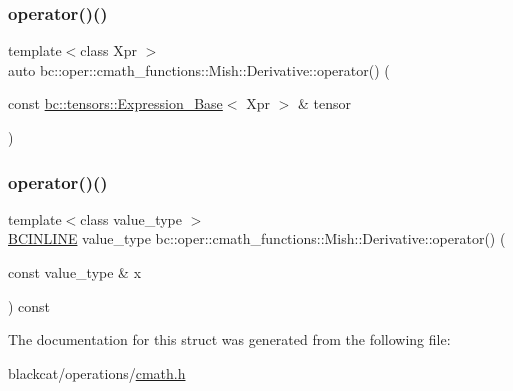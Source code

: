 \mbox{\label{structbc_1_1oper_1_1cmath__functions_1_1Mish_1_1Derivative_a211093825ea4c5a909ed07844444f437}} 
\subsubsection{\texorpdfstring{operator()()}{operator()()}\hspace{0.1cm}{\footnotesize\ttfamily [2/3]}}
{\footnotesize\ttfamily template$<$class Xpr $>$ \\
auto bc\+::oper\+::cmath\+\_\+functions\+::\+Mish\+::\+Derivative\+::operator() (\begin{DoxyParamCaption}\item[{const \hyperlink{classbc_1_1tensors_1_1Expression__Base}{bc\+::tensors\+::\+Expression\+\_\+\+Base}$<$ Xpr $>$ \&}]{tensor }\end{DoxyParamCaption})\hspace{0.3cm}{\ttfamily [inline]}}

\mbox{\label{structbc_1_1oper_1_1cmath__functions_1_1Mish_1_1Derivative_a3b861c6da9893fa730f8a04bcece5d4d}} 
\subsubsection{\texorpdfstring{operator()()}{operator()()}\hspace{0.1cm}{\footnotesize\ttfamily [3/3]}}
{\footnotesize\ttfamily template$<$class value\+\_\+type $>$ \\
\hyperlink{common_8h_a6699e8b0449da5c0fafb878e59c1d4b1}{B\+C\+I\+N\+L\+I\+NE} value\+\_\+type bc\+::oper\+::cmath\+\_\+functions\+::\+Mish\+::\+Derivative\+::operator() (\begin{DoxyParamCaption}\item[{const value\+\_\+type \&}]{x }\end{DoxyParamCaption}) const\hspace{0.3cm}{\ttfamily [inline]}}



The documentation for this struct was generated from the following file\+:\begin{DoxyCompactItemize}
\item 
blackcat/operations/\hyperlink{cmath_8h}{cmath.\+h}\end{DoxyCompactItemize}
